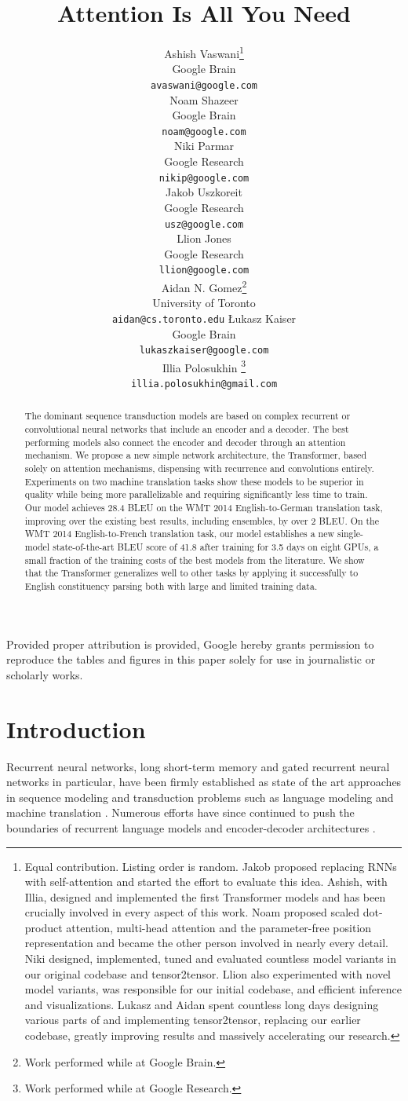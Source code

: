 \documentclass{article}
\title{Attention Is All You Need}
\author{
  \AND
  Ashish Vaswani\thanks{Equal contribution. Listing order is random. Jakob proposed replacing RNNs with self-attention and started the effort to evaluate this idea.
Ashish, with Illia, designed and implemented the first Transformer models and has been crucially involved in every aspect of this work. Noam proposed scaled dot-product attention, multi-head attention and the parameter-free position representation and became the other person involved in nearly every detail. Niki designed, implemented, tuned and evaluated countless model variants in our original codebase and tensor2tensor. Llion also experimented with novel model variants, was responsible for our initial codebase, and efficient inference and visualizations. Lukasz and Aidan spent countless long days designing various parts of and implementing tensor2tensor, replacing our earlier codebase, greatly improving results and massively accelerating our research.
}\\
  Google Brain\\
  \texttt{avaswani@google.com}\\
  \And
  Noam Shazeer\footnotemark[1]\\
  Google Brain\\
  \texttt{noam@google.com}\\
  \And
  Niki Parmar\footnotemark[1]\\
  Google Research\\
  \texttt{nikip@google.com}\\  
  \And
  Jakob Uszkoreit\footnotemark[1]\\
  Google Research\\
  \texttt{usz@google.com}\\
  \And  
  Llion Jones\footnotemark[1]\\
  Google Research\\
  \texttt{llion@google.com}\\   
  \And
  Aidan N. Gomez\footnotemark[1] \hspace{1.7mm}\thanks{Work performed while at Google Brain.}\\
  University of Toronto\\
  \texttt{aidan@cs.toronto.edu}
  \And
  {\L}ukasz Kaiser\footnotemark[1]\\
  Google Brain\\
  \texttt{lukaszkaiser@google.com}\\
  \And
  Illia Polosukhin\footnotemark[1]\hspace{1.7mm} \thanks{Work performed while at Google Research.}\\
  \texttt{illia.polosukhin@gmail.com}\\  
}
\begin{document}
\begin{center}
  \color{red}
  \large Provided proper attribution is provided, Google hereby grants permission to reproduce the tables and figures in this paper solely for use in journalistic or scholarly works.
\end{center}

\maketitle

\begin{abstract}
  The dominant sequence transduction models are based on complex recurrent or convolutional neural networks that include an encoder and a decoder. The best performing models also connect the encoder and decoder through an attention mechanism. We propose a new simple network architecture, the Transformer, based solely on attention mechanisms, dispensing with recurrence and convolutions entirely. Experiments on two machine translation tasks show these models to be superior in quality while being  more parallelizable and requiring significantly less time to train. Our model achieves 28.4 BLEU on the WMT 2014 English-to-German translation task, improving over the existing best results, including ensembles, by over 2 BLEU.  On the WMT 2014 English-to-French translation task, our model establishes a new single-model state-of-the-art BLEU score of 41.8 after training for 3.5 days on eight GPUs, a small fraction of the training costs of the best models from the literature. We show that the Transformer generalizes well to other tasks by applying it successfully to English constituency parsing  both with large and limited training data.





\end{abstract}

\section{Introduction}

Recurrent neural networks, long short-term memory \citep{hochreiter1997} and gated recurrent \citep{gruEval14} neural networks in particular, have been firmly established as state of the art approaches in sequence modeling and transduction problems such as language modeling and machine translation \citep{sutskever14, bahdanau2014neural, cho2014learning}. Numerous efforts have since continued to push the boundaries of recurrent language models and encoder-decoder architectures \citep{wu2016google,luong2015effective,jozefowicz2016exploring}.
\end{document}
